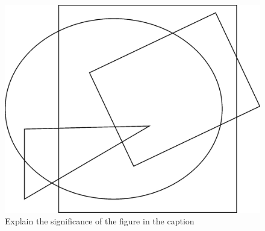 \begin{figure}[htbp]
	\begin{center}
		\includegraphics[width=0.8\linewidth]{img/fig2.jpg} 
	\end{center}
	\caption{Explain the significance of the figure in the caption} \label{fig:fig2}
\end{figure}



